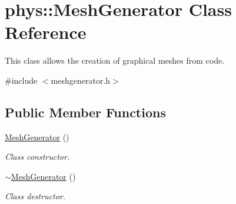 \hypertarget{classphys_1_1MeshGenerator}{
\section{phys::MeshGenerator Class Reference}
\label{df/d6e/classphys_1_1MeshGenerator}
}


This class allows the creation of graphical meshes from code.  




{\ttfamily \#include $<$meshgenerator.h$>$}

\subsection*{Public Member Functions}
\begin{DoxyCompactItemize}
\item 
\hypertarget{classphys_1_1MeshGenerator_a70b6d0b67c6e8c833ee2bd85b3265aa7}{
\hyperlink{classphys_1_1MeshGenerator_a70b6d0b67c6e8c833ee2bd85b3265aa7}{MeshGenerator} ()}
\label{df/d6e/classphys_1_1MeshGenerator_a70b6d0b67c6e8c833ee2bd85b3265aa7}

\begin{DoxyCompactList}\small\item\em Class constructor. \item\end{DoxyCompactList}\item 
\hypertarget{classphys_1_1MeshGenerator_a5108974e947a2f0e51d632fd502d0ba0}{
\hyperlink{classphys_1_1MeshGenerator_a5108974e947a2f0e51d632fd502d0ba0}{$\sim$MeshGenerator} ()}
\label{df/d6e/classphys_1_1MeshGenerator_a5108974e947a2f0e51d632fd502d0ba0}

\begin{DoxyCompactList}\small\item\em Class destructor. \item\end{DoxyCompactList}\end{DoxyCompactItemize}
